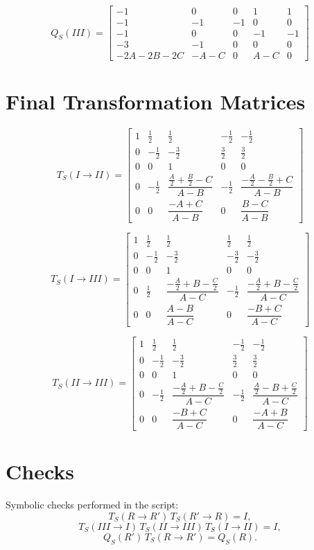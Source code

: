 \documentclass[11pt]{article}
\begin{document}
\[
Q_S(III)=
\begin{bmatrix}
-1&0&0&1&1\\
-1&-1&-1&0&0\\
-1&0&0&-1&-1\\
-3&-1&0&0&0\\
-2A-2B-2C&-A-C&0&A-C&0
\end{bmatrix}
\]

\section*{Final Transformation Matrices}
\[
T_S(I\to II)=
\begin{bmatrix}
1&\frac12&\frac12&-\frac12&-\frac12\\
0&-\frac12&-\frac32&\frac32&\frac32\\
0&0&1&0&0\\
0&-\frac12&\dfrac{\frac{A}{2}+\frac{B}{2}-C}{A-B}&-\frac12&\dfrac{-\frac{A}{2}-\frac{B}{2}+C}{A-B}\\
0&0&\dfrac{-A+C}{A-B}&0&\dfrac{B-C}{A-B}
\end{bmatrix}
\]

\[
T_S(I\to III)=
\begin{bmatrix}
1&\frac12&\frac12&\frac12&\frac12\\
0&-\frac12&-\frac32&-\frac32&-\frac32\\
0&0&1&0&0\\
0&\frac12&\dfrac{-\frac{A}{2}+B-\frac{C}{2}}{A-C}&-\frac12&\dfrac{-\frac{A}{2}+B-\frac{C}{2}}{A-C}\\
0&0&\dfrac{A-B}{A-C}&0&\dfrac{-B+C}{A-C}
\end{bmatrix}
\]

\[
T_S(II\to III)=
\begin{bmatrix}
1&\frac12&\frac12&-\frac12&-\frac12\\
0&-\frac12&-\frac32&\frac32&\frac32\\
0&0&1&0&0\\
0&-\frac12&\dfrac{-\frac{A}{2}+B-\frac{C}{2}}{A-C}&-\frac12&\dfrac{\frac{A}{2}-B+\frac{C}{2}}{A-C}\\
0&0&\dfrac{-B+C}{A-C}&0&\dfrac{-A+B}{A-C}
\end{bmatrix}
\]

\section*{Checks}
Symbolic checks performed in the script:
\[
T_S(R\to R')\,T_S(R'\to R)=I,
\]
\[
T_S(III\to I)\,T_S(II\to III)\,T_S(I\to II)=I,
\]
\[
Q_S(R')\,T_S(R\to R')=Q_S(R).
\]
\end{document}
